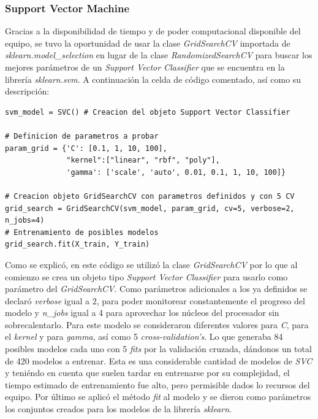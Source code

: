 \subsubsection{Support Vector Machine}

Gracias a la disponibilidad de tiempo y de poder computacional disponible del equipo, se tuvo la oportunidad de usar la clase \textit{GridSearchCV} importada de \textit{sklearn.model\_selection} en lugar de la clase \textit{RandomizedSearchCV} para buscar los mejores parámetros de un \textit{Support Vector Classifier} que se encuentra en la librería \textit{sklearn.svm}. A continuación la celda de código comentado, así como su descripción: \\


\begin{lstlisting}[caption={Código \textit{GridSearchCV} para \textit{SVC}}]
svm_model = SVC() # Creacion del objeto Support Vector Classifier

# Definicion de parametros a probar
param_grid = {'C': [0.1, 1, 10, 100], 
              "kernel":["linear", "rbf", "poly"],
              'gamma': ['scale', 'auto', 0.01, 0.1, 1, 10, 100]}

# Creacion objeto GridSearchCV con parametros definidos y con 5 CV
grid_search = GridSearchCV(svm_model, param_grid, cv=5, verbose=2, n_jobs=4)
# Entrenamiento de posibles modelos
grid_search.fit(X_train, Y_train)
\end{lstlisting}

Como se explicó, en este código se utilizó la clase \textit{GridSearchCV} por lo que al comienzo se crea un objeto tipo \textit{Support Vector Classifier} para usarlo como parámetro del \textit{GridSearchCV}. Como parámetros adicionales a los ya definidos se declaró \textit{verbose} igual a 2, para poder monitorear constantemente el progreso del modelo y \textit{n\_jobs} igual a 4 para aprovechar los núcleos del procesador sin sobrecalentarlo. Para este modelo se consideraron diferentes valores para \textit{C}, para el \textit{kernel} y para \textit{gamma}, así como 5 \textit{cross-validation's}. Lo que generaba 84 posibles modelos cada uno con 5 \textit{fits} por la validación cruzada, dándonos un total de 420 modelos a entrenar. Esta es una considerable cantidad de modelos de \textit{SVC} y teniéndo en cuenta que suelen tardar en entrenarse por su complejidad, el tiempo estimado de entrenamiento fue alto, pero permisible dados lo recursos del equipo. Por último se aplicó el método \textit{fit} al modelo y se dieron como parámetros los conjuntos creados para los modelos de la librería \textit{sklearn}.

